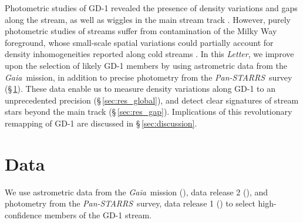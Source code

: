 \documentclass[modern]{aastex62}
\newcommand{\acronym}[1]{{\small{#1}}}
\newcommand{\gaia}{\textsl{Gaia}}
\newcommand{\pans}{\textsl{Pan-STARRS}}
\newcommand{\DR}{\acronym{DR2}}
\newcommand{\article}{\textsl{Letter}}
\newcommand{\todo}[1]{{\color{red} TODO: #1}}
\begin{document}
Photometric studies of GD-1 revealed the presence of density variations and gaps
along the stream, as well as wiggles in the main stream track
\citep[][]{Carlberg:2013, DeBoer:2018}.
However, purely photometric studies of streams suffer from contamination of the
Milky Way foreground, whose small-scale spatial variations could partially
account for density inhomogeneities reported along cold streams
\citep[e.g.,][]{Ibata:2016}.
In this \article, we improve upon the selection of likely GD-1 members by using
astrometric data from the \gaia\ mission, in addition to precise photometry from
the \pans\ survey (\S\,\ref{sec:data}).
These data enable us to measure density variations along GD-1 to an
unprecedented precision (\S\,\ref{sec:res_global}), and detect clear signatures
of stream stars beyond the main track (\S\,\ref{sec:res_gap}).
Implications of this revolutionary remapping of GD-1 are discussed in
\S\,\ref{sec:discussion}.
%


\section{Data}
\label{sec:data}

We use astrometric data from the \gaia\ mission (\citealt{Prusti:2016}), data
release 2 (\citealt{Gaia-Collaboration:2018, Lindegren:2018}), and photometry
from the \pans\ survey, data release 1 (\citealt{Chambers:2016}) to select
high-confidence members of the GD-1 stream.
\end{document}
